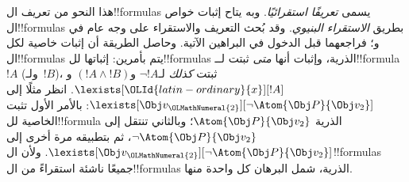 \documentclass[../../../include/open-logic-section]{subfiles}
\begin{document}
هذا النحو من تعريف ال!!{formula}s يسمى \emph{تعريفًا استقرائيًا}.
وبه يتاح إثبات خواص ال!!{formula}s بطريق \emph{الاستقراء البنيوي}.
وقد بُحث التعريف والاستقراء على وجه عام في
 و؛
فراجعهما قبل الدخول في البراهين الآتية. وحاصل الطريقة أن إثبات
خاصية لكل ال!!{formula}s يتم بأمرين: إثباتها لل!!{formula}s
الذرية، وإثبات أنها \emph{متى} ثبتت لــ!!{formula}~$!A$
(ولـ~$!B$)، ثبتت \emph{كذلك} لـ$\lnot !A$ و$(!A \land !B)$
و$\lexists[{\OLId{latin-ordinary}{x}}][!A]$. انظر مثلًا إلى
$\lexists[\Obj v_{\OLMathNumeral{2}}][\lnot \Atom{\Obj P}{\Obj v_2}]$:
بالأمر الأول تثبت الخاصية لل!!{formula} الذرية
$\Atom{\Obj P}{\Obj v_2}$؛ وبالثاني تنتقل إلى
$\lnot \Atom{\Obj P}{\Obj v_2}$، ثم بتطبيقه مرة أخرى إلى
$\lexists[\Obj v_{\OLMathNumeral{2}}][\lnot \Atom{\Obj P}{\Obj v_2}]$.
ولأن ال!!{formula}s جميعًا ناشئة استقراءً من ال!!{formula}s
الذرية، شمل البرهان كل واحدة منها.
\end{document}
